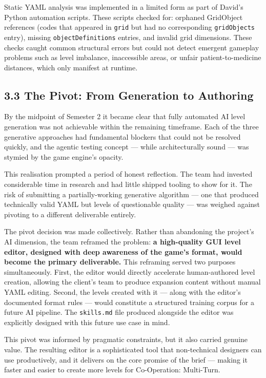 Static YAML analysis was implemented in a limited form as part of
David's Python automation scripts. These scripts checked for: orphaned
GridObject references (codes that appeared in \texttt{grid} but had no
corresponding \texttt{gridObjects} entry), missing
\texttt{objectDefinitions} entries, and invalid grid dimensions. These
checks caught common structural errors but could not detect emergent
gameplay problems such as level imbalance, inaccessible areas, or unfair
patient-to-medicine distances, which only manifest at runtime.

\subsection{3.3 The Pivot: From Generation to
Authoring}\label{the-pivot-from-generation-to-authoring}

By the midpoint of Semester 2 it became clear that fully automated AI
level generation was not achievable within the remaining timeframe. Each
of the three generative approaches had fundamental blockers that could
not be resolved quickly, and the agentic testing concept --- while
architecturally sound --- was stymied by the game engine's opacity.

This realisation prompted a period of honest reflection. The team had
invested considerable time in research and had little shipped tooling to
show for it. The risk of submitting a partially-working generative
algorithm --- one that produced technically valid YAML but levels of
questionable quality --- was weighed against pivoting to a different
deliverable entirely.

The pivot decision was made collectively. Rather than abandoning the
project's AI dimension, the team reframed the problem: \textbf{a
high-quality GUI level editor, designed with deep awareness of the
game's format, would become the primary deliverable.} This reframing
served two purposes simultaneously. First, the editor would directly
accelerate human-authored level creation, allowing the client's team to
produce expansion content without manual YAML editing. Second, the
levels created with it --- along with the editor's documented format
rules --- would constitute a structured training corpus for a future AI
pipeline. The \texttt{skills.md} file produced alongside the editor was
explicitly designed with this future use case in mind.

This pivot was informed by pragmatic constraints, but it also carried
genuine value. The resulting editor is a sophisticated tool that
non-technical designers can use productively, and it delivers on the
core promise of the brief --- making it faster and easier to create more
levels for Co-Operation: Multi-Turn.

